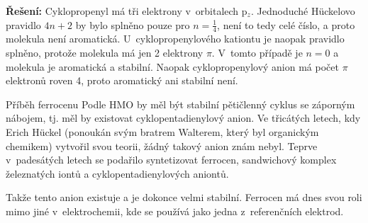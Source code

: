 \textbf{Řešení:} Cyklopropenyl má tři elektrony v~orbitalech p$_z$. Jednoduché H\"{u}ckelovo pravidlo $4n+2$ by bylo splněno pouze pro $n=\frac{1}{4}$, není to tedy celé číslo, a proto molekula není aromatická. U~cyklopropenylového kationtu je naopak pravidlo splněno, protože molekula má jen 2 elektrony $\pi$. V~tomto případě je $n=0$ a molekula je aromatická a stabilní. Naopak cyklopropenylový anion má počet $\pi$ elektronů roven 4, proto aromatický ani stabilní není. 

\begin{ourbox}{Příběh ferrocenu}
Podle HMO by měl být stabilní pětičlenný cyklus se záporným nábojem, tj. měl by existovat cyklopentadienylový anion. Ve třicátých letech, kdy Erich H\"{u}ckel (ponoukán svým bratrem Walterem, který byl organickým chemikem) vytvořil svou teorii, žádný takový anion znám nebyl. Teprve v~padesátých letech se podařilo syntetizovat ferrocen, sandwichový komplex železnatých iontů a cyklopentadienylových aniontů. 


Takže tento anion existuje a je dokonce velmi stabilní. Ferrocen má dnes svou roli mimo jiné v~elektrochemii, kde se používá jako jedna z~referenčních elektrod. 
\end{ourbox}